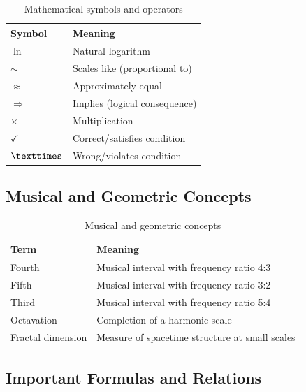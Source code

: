 	\begin{table}[htbp]
		\centering
		\begin{tabular}{p{3cm}p{9cm}}
			\toprule
			\textbf{Symbol} & \textbf{Meaning} \\
			\midrule
			$\ln$ & Natural logarithm \\
			$\sim$ & Scales like (proportional to) \\
			$\approx$ & Approximately equal \\
			$\Rightarrow$ & Implies (logical consequence) \\
			$\times$ & Multiplication \\
			$\checkmark$ & Correct/satisfies condition \\
			$\texttimes$ & Wrong/violates condition \\
			\bottomrule
		\end{tabular}
		\caption{Mathematical symbols and operators}
	\end{table}
	
	\subsection{Musical and Geometric Concepts}
	
	\begin{table}[htbp]
		\centering
		\begin{tabular}{p{3cm}p{9cm}}
			\toprule
			\textbf{Term} & \textbf{Meaning} \\
			\midrule
			Fourth & Musical interval with frequency ratio 4:3 \\
			Fifth & Musical interval with frequency ratio 3:2 \\
			Third & Musical interval with frequency ratio 5:4 \\
			Octavation & Completion of a harmonic scale \\
			Fractal dimension & Measure of spacetime structure at small scales \\
			\bottomrule
		\end{tabular}
		\caption{Musical and geometric concepts}
	\end{table}
	
	\subsection{Important Formulas and Relations}
	
